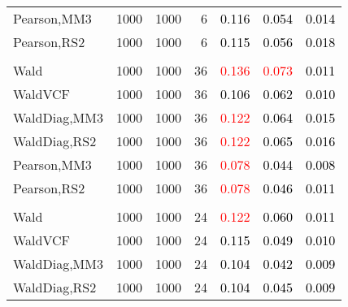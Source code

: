 \documentclass[
]{article}
\begin{document}
\begin{table}[H]
{\begin{tabular}[t]{lrrrrrr}
\hspace{1em}Pearson,MM3 & 1000 & 1000 & 6 & \textcolor{black}{0.116} & \textcolor{black}{0.054} & \textcolor{black}{0.014}\\
\hspace{1em}Pearson,RS2 & 1000 & 1000 & 6 & \textcolor{black}{0.115} & \textcolor{black}{0.056} & \textcolor{black}{0.018}\\
\addlinespace[0.3em]
\multicolumn{7}{l}{\textbf{1F 15V}}\\
\hspace{1em}Wald & 1000 & 1000 & 36 & \textcolor{red}{0.136} & \textcolor{red}{0.073} & \textcolor{black}{0.011}\\
\hspace{1em}WaldVCF & 1000 & 1000 & 36 & \textcolor{black}{0.106} & \textcolor{black}{0.062} & \textcolor{black}{0.010}\\
\hspace{1em}WaldDiag,MM3 & 1000 & 1000 & 36 & \textcolor{red}{0.122} & \textcolor{black}{0.064} & \textcolor{black}{0.015}\\
\hspace{1em}WaldDiag,RS2 & 1000 & 1000 & 36 & \textcolor{red}{0.122} & \textcolor{black}{0.065} & \textcolor{black}{0.016}\\
\hspace{1em}Pearson,MM3 & 1000 & 1000 & 36 & \textcolor{red}{0.078} & \textcolor{black}{0.044} & \textcolor{black}{0.008}\\
\hspace{1em}Pearson,RS2 & 1000 & 1000 & 36 & \textcolor{red}{0.078} & \textcolor{black}{0.046} & \textcolor{black}{0.011}\\
\addlinespace[0.3em]
\multicolumn{7}{l}{\textbf{2F 10V}}\\
\hspace{1em}Wald & 1000 & 1000 & 24 & \textcolor{red}{0.122} & \textcolor{black}{0.060} & \textcolor{black}{0.011}\\
\hspace{1em}WaldVCF & 1000 & 1000 & 24 & \textcolor{black}{0.115} & \textcolor{black}{0.049} & \textcolor{black}{0.010}\\
\hspace{1em}WaldDiag,MM3 & 1000 & 1000 & 24 & \textcolor{black}{0.104} & \textcolor{black}{0.042} & \textcolor{black}{0.009}\\
\hspace{1em}WaldDiag,RS2 & 1000 & 1000 & 24 & \textcolor{black}{0.104} & \textcolor{black}{0.045} & \textcolor{black}{0.009}\\

\end{tabular}}
\end{table}
\end{document}
